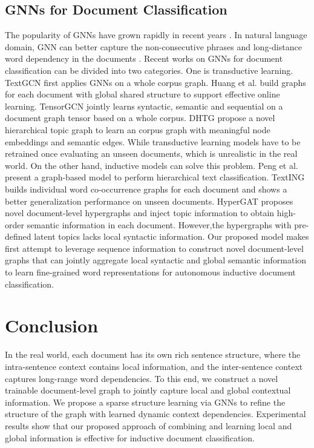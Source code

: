 \documentclass[letterpaper]{article} %
\begin{document}
\subsection{GNNs for Document Classification}
The popularity of GNNs have grown rapidly in recent years \cite{kipf2017semi, velivckovic2018graph, hamilton2017inductive,xu2018powerful}. 
In natural language domain, GNN can better capture the non-consecutive phrases and long-distance word dependency in the documents \cite{wu2020comprehensive, li2020survey}. Recent works on GNNs for document classification can be divided into two categories.
One is transductive learning. TextGCN \cite{yao2019graph} first applies GNNs on a whole corpus graph. Huang et al. \cite{huang2019text} build graphs for each document with global shared structure to support effective online learning. TensorGCN \cite{liu2020tensor} jointly learns syntactic, semantic and sequential on a document graph tensor based on a whole corpus. DHTG \cite{wang2020learning} propose a novel hierarchical topic graph to learn an corpus graph with meaningful node embeddings and semantic edges.
While transductive learning models have to be retrained once evaluating an unseen documents, which is unrealistic in the real world.
On the other hand, inductive models can solve this problem. Peng et al. \cite{peng2018large} present a graph-based model to perform hierarchical text classification. TextING \cite{zhang2020every} builds individual word co-occurrence graphs for each document and shows a better generalization performance on unseen documents. 
HyperGAT \cite{ding2020more} proposes novel document-level hypergraphs and inject topic information to obtain high-order semantic information in each document. 
However,the hypergraphs with pre-defined latent topics lacks local syntactic information. 
Our proposed model makes first attempt to leverage sequence information to construct novel document-level graphs that can jointly aggregate local syntactic and global semantic information to learn fine-grained word representations for autonomous inductive document classification. 

\section{Conclusion}

In the real world, each document has its own rich sentence structure, where the intra-sentence context contains local information, and the inter-sentence context captures long-range word dependencies. To this end, we construct a novel trainable document-level graph to jointly capture local and global contextual information. We propose a sparse structure learning via GNNs to refine the structure of the graph with learned dynamic context dependencies. Experimental results show that our proposed approach of combining and learning local and global information is effective for inductive document classification.
\end{document}
